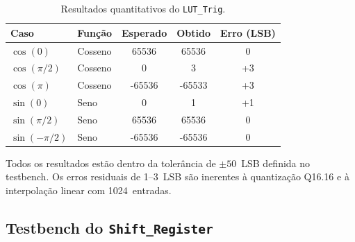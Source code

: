 \documentclass[a4paper,12pt]{article}
\begin{document}
\begin{table}[H]
\centering
\caption{Resultados quantitativos do \texttt{LUT\_Trig}.}
\label{tab:lut_results}
\small
\begin{tabular}{llccc}
\hline
\textbf{Caso} & \textbf{Fun\c{c}\~ao} & \textbf{Esperado} & \textbf{Obtido} & \textbf{Erro (LSB)} \\
\hline
$\cos(0)$          & Cosseno & 65536  & 65536  & 0   \\
$\cos(\pi/2)$      & Cosseno & 0      & 3      & +3  \\
$\cos(\pi)$        & Cosseno & -65536 & -65533 & +3  \\
$\sin(0)$          & Seno    & 0      & 1      & +1  \\
$\sin(\pi/2)$      & Seno    & 65536  & 65536  & 0   \\
$\sin(-\pi/2)$     & Seno    & -65536 & -65536 & 0   \\
\hline
\end{tabular}
\end{table}

Todos os resultados est\~ao dentro da toler\^ancia de $\pm 50$~LSB definida no testbench.
Os erros residuais de 1--3~LSB s\~ao inerentes \`a quantiza\c{c}\~ao Q16.16 e \`a
interpola\c{c}\~ao linear com 1024~entradas.

\subsection{Testbench do \texttt{Shift\_Register}}
\end{document}
